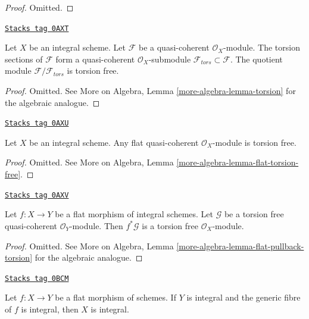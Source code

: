 \begin{proof}
Omitted.
\end{proof}

\begin{lemma}[Torsion]
\label{divisors-lemma-torsion}
\href{https://stacks.math.columbia.edu/tag/0AXT}{\texttt{Stacks tag 0AXT}}

Let $X$ be an integral scheme. Let $\mathcal{F}$ be a quasi-coherent
$\mathcal{O}_X$-module. The torsion sections of $\mathcal{F}$ form
a quasi-coherent $\mathcal{O}_X$-submodule
$\mathcal{F}_{tors} \subset \mathcal{F}$.
The quotient module $\mathcal{F}/\mathcal{F}_{tors}$ is torsion free.
\end{lemma}

\begin{proof}
Omitted. See More on Algebra, Lemma \ref{more-algebra-lemma-torsion}
for the algebraic analogue.
\end{proof}

\begin{lemma}
\label{divisors-lemma-flat-torsion-free}
\href{https://stacks.math.columbia.edu/tag/0AXU}{\texttt{Stacks tag 0AXU}}

Let $X$ be an integral scheme. Any flat quasi-coherent $\mathcal{O}_X$-module
is torsion free.
\end{lemma}

\begin{proof}
Omitted. See More on Algebra, Lemma \ref{more-algebra-lemma-flat-torsion-free}.
\end{proof}

\begin{lemma}
\label{divisors-lemma-flat-pullback-torsion}
\href{https://stacks.math.columbia.edu/tag/0AXV}{\texttt{Stacks tag 0AXV}}

Let $f : X \to Y$ be a flat morphism of integral schemes.
Let $\mathcal{G}$ be a torsion free quasi-coherent $\mathcal{O}_Y$-module.
Then $f^*\mathcal{G}$ is a torsion free $\mathcal{O}_X$-module.
\end{lemma}

\begin{proof}
Omitted. See
More on Algebra, Lemma \ref{more-algebra-lemma-flat-pullback-torsion}
for the algebraic analogue.
\end{proof}

\begin{lemma}
\label{divisors-lemma-flat-over-integral-integral-fibre}
\href{https://stacks.math.columbia.edu/tag/0BCM}{\texttt{Stacks tag 0BCM}}

Let $f : X \to Y$ be a flat morphism of schemes. If $Y$ is integral
and the generic fibre of $f$ is integral, then $X$ is integral.
\end{lemma}

